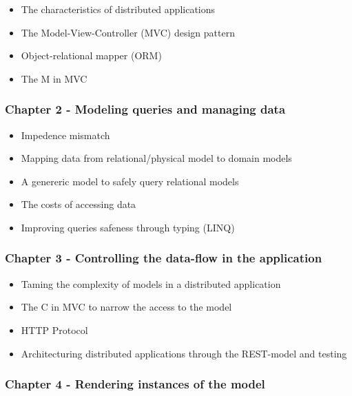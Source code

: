\begin{itemize}
\tightlist
\item
  The characteristics of distributed applications
\item
  The Model-View-Controller (MVC) design pattern
\item
  Object-relational mapper (ORM)
\item
  The M in MVC
\end{itemize}

\subsubsection{Chapter 2 - Modeling queries and managing
data}\label{chapter-2---modeling-queries-and-managing-data}

\begin{itemize}
\tightlist
\item
  Impedence mismatch
\item
  Mapping data from relational/physical model to domain models
\item
  A genereric model to safely query relational models
\item
  The costs of accessing data
\item
  Improving queries safeness through typing (LINQ)
\end{itemize}

\subsubsection{Chapter 3 - Controlling the data-flow in the
application}\label{chapter-3---controlling-the-data-flow-in-the-application}

\begin{itemize}
\tightlist
\item
  Taming the complexity of models in a distributed application
\item
  The C in MVC to narrow the access to the model
\item
  HTTP Protocol
\item
  Architecturing distributed applications through the REST-model and
  testing
\end{itemize}

\subsubsection{Chapter 4 - Rendering instances of the
model}\label{chapter-4---rendering-instances-of-the-model}

